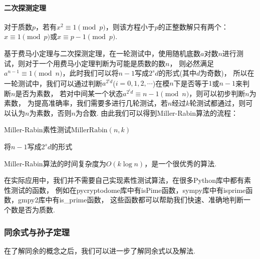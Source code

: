 \documentclass{article}
\numberwithin{equation}{subsubsection}
\begin{document}
\paragraph{\textbf{二次探测定理}}
对于质数$p$，若有$x^2\equiv 1\pmod{p}$，则该方程小于$p$的正整数解只有两个：$x\equiv 1\pmod{p}$或$x\equiv p-1\pmod{p}$.\par
基于费马小定理与二次探测定理，在一轮测试中，使用随机底数$a$对数$n$进行测试，则对于一个用费马小定理判断为可能是质数的数$n$，
则必然满足$a^{n-1}\equiv 1\pmod{n}$，此时我们可以将$n-1$写成$2^sd$的形式(其中$d$为奇数)，
所以在一轮测试中，我们可以通过判断$a^{2^{i}d}$($i=0,1,2,\cdots $)在模$n$下是否等于$1$或$n-1$来判断$n$是否为素数，
若对中间某一个状态$a^{2^{i}d}\equiv n-1\pmod{n}$，则可以初步判断$n$为素数，
为提高准确率，我们需要多进行几轮测试，若$n$经过$k$轮测试都通过，则可以认为$n$为素数，否则$n$为合数.
由此我们可以得到Miller-Rabin算法的流程：
\begin{algorithm}
    \caption{Miller-Rabin素性测试$\text{MillerRabin}(n,k)$}
    将$n-1$写成$2^sd$的形式\\
\end{algorithm}\par
Miller-Rabin算法的时间复杂度为$O(k\log{n})$，是一个很优秀的算法.\par
在实际应用中，我们并不需要自己实现素性测试算法，在很多Python库中都有素性测试的函数，
例如在pycryptodome库中有isPime函数，sympy库中有isprime函数，gmpy2库中有is\_prime函数，
这些函数都可以帮助我们快速、准确地判断一个数是否为质数.

\subsubsection{同余式与孙子定理}
在了解同余的概念之后，我们可以进一步了解同余式以及解法.\par
\end{document}
